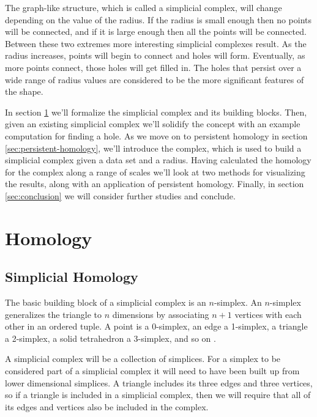 The graph-like structure, which is called a simplicial complex, will change depending on the value of the radius.
If the radius is small enough then no points will be connected, and if it is large enough then all the points will be connected.
Between these two extremes more interesting simplicial complexes result.
As the radius increases, points will begin to connect and holes will form.
Eventually, as more points connect, those holes will get filled in.
The holes that persist over a wide range of radius values are considered to be the more significant features of the shape.

In section \ref{sec:homology} we'll formalize the simplicial complex and its building blocks.
Then, given an existing simplicial complex we'll solidify the concept with an example computation for finding a hole.
As we move on to persistent homology in section \ref{sec:persistent-homology}, we'll introduce the \cech complex, which is used to build a simplicial complex given a data set and a radius.
Having calculated the homology for the \cech complex along a range of scales we'll look at two methods for visualizing the results, along with an application of persistent homology.
Finally, in section \ref{sec:conclusion} we will consider further studies and conclude.

\section{Homology}\label{sec:homology}

\subsection{Simplicial Homology}\label{sec:simplicial-homology}

The basic building block of a simplicial complex is an \(n\)-simplex. %
An \(n\)-simplex generalizes the triangle to \(n\) dimensions by associating \(n+1\) vertices with each other in an ordered tuple.
A point is a 0-simplex, an edge a 1-simplex, a triangle a 2-simplex, a solid tetrahedron a 3-simplex, and so on .

\begin{figure}
    
    \caption{}
    \label{fig:basic-simplices}
\end{figure}

A simplicial complex will be a collection of simplices.
For a simplex to be considered part of a simplicial complex it will need to have been built up from lower dimensional simplices.
A triangle includes its three edges and three vertices, so if a triangle is included in a simplicial complex, then we will require that all of its edges and vertices also be included in the complex.

